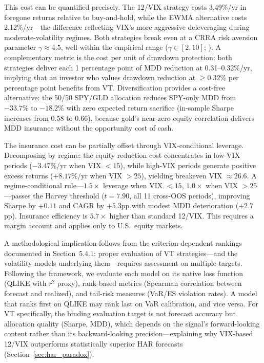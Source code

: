 This cost can be quantified precisely. The 12/VIX strategy costs 3.49\%/yr in foregone returns relative to buy-and-hold, while the EWMA alternative costs 2.12\%/yr---the difference reflecting VIX's more aggressive deleveraging during moderate-volatility regimes. Both strategies break even at a CRRA risk aversion parameter $\gamma \approx 4.5$, well within the empirical range ($\gamma \in [2, 10]$; \citealt{cederburg2020}). A complementary metric is the cost per unit of drawdown protection: both strategies deliver each 1 percentage point of MDD reduction at 0.31--0.32\%/yr, implying that an investor who values drawdown reduction at $\geq 0.32\%$ per percentage point benefits from VT. Diversification provides a cost-free alternative: the 50/50 SPY/GLD allocation reduces SPY-only MDD from $-33.7\%$ to $-18.2\%$ with zero expected return sacrifice (in-sample Sharpe increases from 0.58 to 0.66), because gold's near-zero equity correlation delivers MDD insurance without the opportunity cost of cash.

The insurance cost can be partially offset through VIX-conditional leverage. Decomposing by regime: the equity reduction cost concentrates in low-VIX periods ($-3.47\%$/yr when VIX $< 15$), while high-VIX periods generate positive excess returns ($+8.17\%$/yr when VIX $> 25$), yielding breakeven VIX $\approx 26.6$. A regime-conditional rule---$1.5\times$ leverage when VIX $< 15$, $1.0\times$ when VIX $> 25$---passes the Harvey threshold ($t = 7.90$, all 11 cross-OOS periods), improving Sharpe by $+0.11$ and CAGR by $+5.3$pp with modest MDD deterioration ($+2.7$pp). Insurance efficiency is $5.7\times$ higher than standard 12/VIX. This requires a margin account and applies only to U.S.\ equity markets.

A methodological implication follows from the criterion-dependent rankings documented in Section~5.4.1: proper evaluation of VT strategies---and the volatility models underlying them---requires assessment on multiple targets. Following the \citet{patton2011} framework, we evaluate each model on its native loss function (QLIKE with $r^2$ proxy), rank-based metrics (Spearman correlation between forecast and realized), and tail-risk measures (VaR/ES violation rates). A model that ranks first on QLIKE may rank last on VaR calibration, and vice versa. For VT specifically, the binding evaluation target is not forecast accuracy but allocation quality (Sharpe, MDD), which depends on the signal's forward-looking content rather than its backward-looking precision---explaining why VIX-based 12/VIX outperforms statistically superior HAR forecasts (Section~\ref{sec:har_paradox}).

